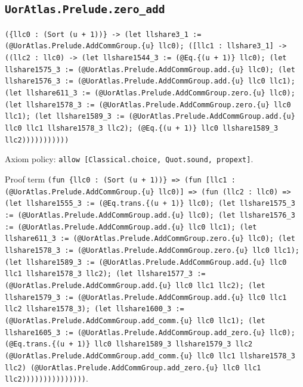 \documentclass[11pt]{article}
\begin{document}
\subsection*{\texttt{UorAtlas.Prelude.zero\_add}}
\noindent\texttt{(\{llc0 : (Sort (u + 1))\} -> (let llshare3\_1 := (@UorAtlas.Prelude.AddCommGroup.\{u\} llc0); ([llc1 : llshare3\_1] -> ((llc2 : llc0) -> (let llshare1544\_3 := (@Eq.\{(u + 1)\} llc0); (let llshare1575\_3 := (@UorAtlas.Prelude.AddCommGroup.add.\{u\} llc0); (let llshare1576\_3 := (@UorAtlas.Prelude.AddCommGroup.add.\{u\} llc0 llc1); (let llshare611\_3 := (@UorAtlas.Prelude.AddCommGroup.zero.\{u\} llc0); (let llshare1578\_3 := (@UorAtlas.Prelude.AddCommGroup.zero.\{u\} llc0 llc1); (let llshare1589\_3 := (@UorAtlas.Prelude.AddCommGroup.add.\{u\} llc0 llc1 llshare1578\_3 llc2); (@Eq.\{(u + 1)\} llc0 llshare1589\_3 llc2)))))))))))}\par
\noindent Axiom policy: \texttt{allow [Classical.choice, Quot.sound, propext]}.\par
\noindent Proof term \texttt{(fun \{llc0 : (Sort (u + 1))\} => (fun [llc1 : (@UorAtlas.Prelude.AddCommGroup.\{u\} llc0)] => (fun (llc2 : llc0) => (let llshare1555\_3 := (@Eq.trans.\{(u + 1)\} llc0); (let llshare1575\_3 := (@UorAtlas.Prelude.AddCommGroup.add.\{u\} llc0); (let llshare1576\_3 := (@UorAtlas.Prelude.AddCommGroup.add.\{u\} llc0 llc1); (let llshare611\_3 := (@UorAtlas.Prelude.AddCommGroup.zero.\{u\} llc0); (let llshare1578\_3 := (@UorAtlas.Prelude.AddCommGroup.zero.\{u\} llc0 llc1); (let llshare1589\_3 := (@UorAtlas.Prelude.AddCommGroup.add.\{u\} llc0 llc1 llshare1578\_3 llc2); (let llshare1577\_3 := (@UorAtlas.Prelude.AddCommGroup.add.\{u\} llc0 llc1 llc2); (let llshare1579\_3 := (@UorAtlas.Prelude.AddCommGroup.add.\{u\} llc0 llc1 llc2 llshare1578\_3); (let llshare1600\_3 := (@UorAtlas.Prelude.AddCommGroup.add\_comm.\{u\} llc0 llc1); (let llshare1605\_3 := (@UorAtlas.Prelude.AddCommGroup.add\_zero.\{u\} llc0); (@Eq.trans.\{(u + 1)\} llc0 llshare1589\_3 llshare1579\_3 llc2 (@UorAtlas.Prelude.AddCommGroup.add\_comm.\{u\} llc0 llc1 llshare1578\_3 llc2) (@UorAtlas.Prelude.AddCommGroup.add\_zero.\{u\} llc0 llc1 llc2)))))))))))))))}.\par
\end{document}
